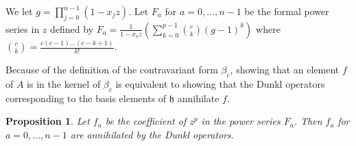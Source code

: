 \documentclass{article}
\numberwithin{equation}{section}
\newtheorem{proposition}[equation]{Proposition}
\newcommand{\h}{\mathfrak{h}}
\begin{document}
We let $g=\prod_{j=0}^{n-1} (1-x_jz)$. Let $F_a$ for $a=0,\dots,n-1$ be the formal power series in $z$ defined by $F_a=\frac{1}{1-x_az} \left( \sum_{k=0}^{p-1} \binom{c}{k}(g-1)^k\right)$ where $\binom{c}{k}=\frac{c(c-1)\dots(c-k+1)}{k!}$. 

Because of the definition of the contravariant form $\beta_c$, showing that an element $f$ of $A$ is in the kernel of $\beta_c$ is equivalent to showing that the Dunkl operators corresponding to the basis elements of $\h$ annihilate $f$.

\begin{proposition}\label{prop:ann} Let $f_a$ be the coefficient of $z^p$ in the power series $F_a$. Then $f_a$ for $a=0,\dots,n-1$ are annihilated by the Dunkl operators. 
\end{proposition}
\end{document}
